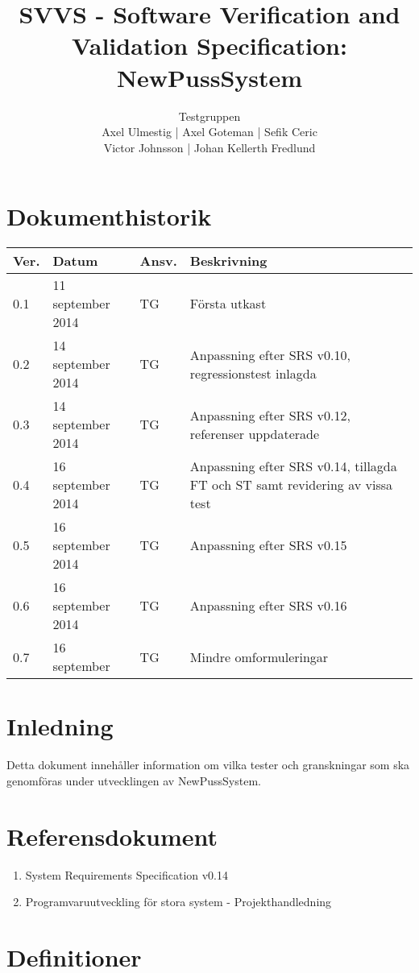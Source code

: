 \documentclass[a4paper]{article}
\title{SVVS - Software Verification and Validation Specification: NewPussSystem}
\author{Testgruppen \\ Axel Ulmestig | Axel Goteman | Sefik Ceric \\ Victor Johnsson | Johan Kellerth Fredlund}
\date{}
\begin{document}
\maketitle
\thispagestyle{fancy}
\tableofcontents
\newpage

\section*{Dokumenthistorik}

\begin{tabular}{ l l l l }
Ver. & Datum & Ansv. & Beskrivning \\\hline
0.1 & 11 september 2014 & TG & Första utkast \\
0.2 & 14 september 2014 & TG & Anpassning efter SRS v0.10, regressionstest inlagda \\
0.3 & 14 september 2014 & TG & Anpassning efter SRS v0.12, referenser uppdaterade\\
0.4 & 16 september 2014 & TG & Anpassning efter SRS v0.14, tillagda FT och ST samt revidering av vissa test\\
0.5 & 16 september 2014 & TG & Anpassning efter SRS v0.15\\
0.6 & 16 september 2014 & TG & Anpassning efter SRS v0.16\\
0.7 & 16 september & TG & Mindre omformuleringar 


\end{tabular}
\section{Inledning}       

Detta dokument innehåller information om vilka tester och granskningar som ska genomföras under utvecklingen av NewPussSystem.

\section{Referensdokument}
\begin{enumerate}
\item System Requirements Specification v0.14
\item Programvaruutveckling för stora system - Projekthandledning
\end{enumerate}

\section{Definitioner}
\end{document}
